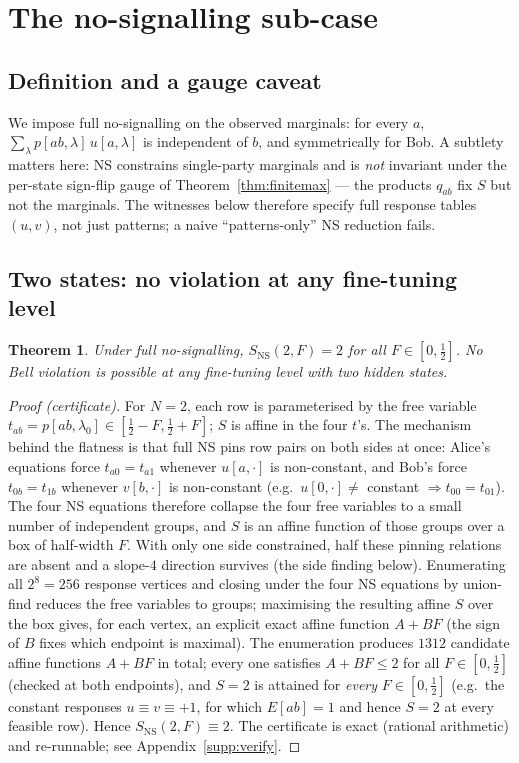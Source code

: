 \documentclass[aps,pra,reprint,superscriptaddress,floatfix]{revtex4-2}
\newtheorem{theorem}{Theorem}
\begin{document}
\section{The no-signalling sub-case}
\label{sec:ns}

\subsection{Definition and a gauge caveat}
We impose full no-signalling on the observed marginals: for every $a$,
$\sum_\lambda p[ab,\lambda]\,u[a,\lambda]$ is independent of $b$, and
symmetrically for Bob. A subtlety matters here: NS constrains single-party
marginals and is \emph{not} invariant under the per-state sign-flip gauge of
Theorem~\ref{thm:finitemax} --- the products $q_{ab}$ fix $S$ but not the marginals. The
witnesses below therefore specify full response tables $(u,v)$, not just
patterns; a naive ``patterns-only'' NS reduction fails.

\subsection{Two states: no violation at any fine-tuning level}
\label{sec:ns2}

\begin{theorem}
\label{thm:ns2}
Under full no-signalling, $S_{\mathrm{NS}}(2,F)=2$ for \emph{all}
$F\in[0,\tfrac12]$. No Bell violation is possible at any fine-tuning level
with two hidden states.
\end{theorem}

\begin{proof}[Proof (certificate)]
For $N=2$, each row is parameterised by the free variable
$t_{ab}=p[ab,\lambda_0]\in[\tfrac12-F,\tfrac12+F]$; $S$ is affine in the
four $t$'s. The mechanism behind the flatness is that full NS pins row
pairs on both sides at once: Alice's equations force $t_{a0}=t_{a1}$ whenever
$u[a,\cdot]$ is non-constant, and Bob's force $t_{0b}=t_{1b}$ whenever
$v[b,\cdot]$ is non-constant (e.g.\ $u[0,\cdot]\ne$ constant $\Rightarrow
t_{00}=t_{01}$). The four NS equations therefore collapse the four free
variables to a small number of independent groups, and $S$ is an affine
function of those groups over a box of half-width $F$. With only one side
constrained, half these pinning relations are absent and a slope-$4$
direction survives (the side finding below). Enumerating all
$2^8=256$ response vertices and closing under the four NS equations by
union-find reduces the free variables to groups; maximising the resulting
affine $S$ over the box gives, for each vertex, an explicit exact affine
function $A+BF$ (the sign of $B$ fixes which endpoint is maximal). The enumeration produces
$1312$ candidate affine functions $A+BF$ in total; every one satisfies
$A+BF\le2$ for all $F\in[0,\tfrac12]$ (checked at both endpoints), and
$S=2$ is attained for \emph{every} $F\in[0,\tfrac12]$ (e.g.\ the constant
responses $u\equiv v\equiv+1$, for which $E[ab]=1$ and hence $S=2$ at every
feasible row). Hence $S_{\mathrm{NS}}(2,F)\equiv2$. The certificate is exact (rational
arithmetic) and re-runnable; see Appendix~\ref{supp:verify}.
\end{proof}
\end{document}
